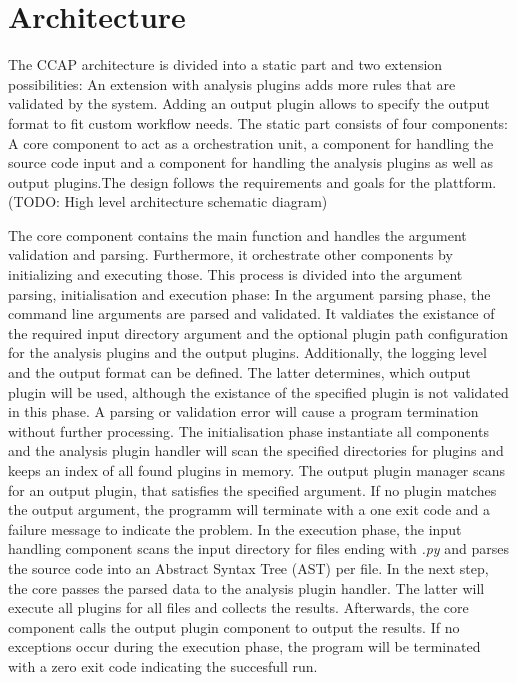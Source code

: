 \section{Architecture}
The CCAP architecture is divided into a static part and two extension possibilities: An extension with analysis plugins adds more rules that are validated by the system. Adding an output plugin allows to specify the output format to fit custom workflow needs.
The static part consists of four components: A core component to act as a orchestration unit, a  component for handling the source code input and a component for handling the analysis plugins as well as output plugins.The design follows the requirements and goals for the plattform. 
(TODO: High level architecture schematic diagram)

The core component contains the main function and handles the argument validation and parsing. Furthermore, it orchestrate other components by initializing and executing those. This process is divided into the argument parsing, initialisation and execution phase:
In the argument parsing phase, the command line arguments are parsed and validated. It valdiates the existance of the required input directory argument and the optional plugin path configuration for the analysis plugins and the output plugins. Additionally, the logging level and the output format can be defined. The latter determines, which output plugin will be used, although the existance of the specified plugin is not validated in this phase. A parsing or validation error will cause a program termination without further processing.
The initialisation phase instantiate all components and the analysis plugin handler will scan the specified directories for plugins and keeps an index of all found plugins in memory. The output plugin manager scans for an output plugin, that satisfies the specified argument. If no plugin matches the output argument, the programm will terminate with a one exit code and a failure message to indicate the problem.
In the execution phase, the input handling component scans the input directory for files ending with \textit{.py} and parses the source code into an Abstract Syntax Tree (AST) per file. In the next step, the core passes the parsed data to the analysis plugin handler. The latter will execute all plugins for all files and collects the results. Afterwards, the core component calls the output plugin component to output the results. If no exceptions occur during the execution phase, the program will be terminated with a zero exit code indicating the succesfull run.

